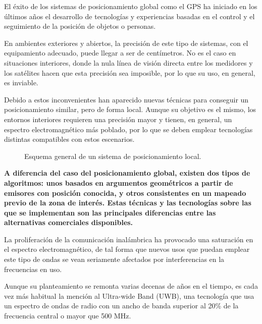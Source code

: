 El éxito de los sistemas de posicionamiento global como el GPS ha iniciado en los últimos años el desarrollo de tecnologías y experiencias basadas en el control y el seguimiento de la posición de objetos o personas.

En ambientes exteriores y abiertos, la precisión de este tipo de sistemas, con el equipamiento adecuado, puede llegar a ser de centímetros.
No es el caso en situaciones interiores, donde la nula línea de visión directa entre los medidores y los satélites hacen que esta precisión sea imposible, por lo que su uso, en general, es inviable.

Debido a estos inconvenientes han aparecido nuevas técnicas para conseguir un posicionamiento similar, pero de forma local.
Aunque su objetivo es el mismo, los entornos interiores requieren una precisión mayor y tienen, en general, un espectro electromagnético más poblado, por lo que se deben emplear tecnologías distintas compatibles con estos escenarios.

\begin{figure}[H]
    \centering
    \def\svgwidth{1.1\linewidth}
    
	\caption{Esquema general de un sistema de posicionamiento local.}
    \label{fig:Gen}
\end{figure}


\textbf{A diferencia del caso del posicionamiento global, existen dos tipos de algoritmos: unos basados en argumentos geométricos a partir de emisores con posición conocida, y otros consistentes en un mapeado previo de la zona de interés.
Estas técnicas y las tecnologías sobre las que se implementan son las principales diferencias entre las alternativas comerciales disponibles.}

La proliferación de la comunicación inalámbrica ha provocado una saturación en el espectro electromagnético, de tal forma que nuevos usos que puedan emplear este tipo de ondas se vean seriamente afectados por interferencias en la frecuencias en uso.

Aunque su planteamiento se remonta varias decenas de años en el tiempo, es cada vez más habitual la mención al Ultra-wide Band (UWB), una tecnología que usa un espectro de ondas de radio con un ancho de banda superior al 20\% de la frecuencia central o mayor que 500 MHz.

